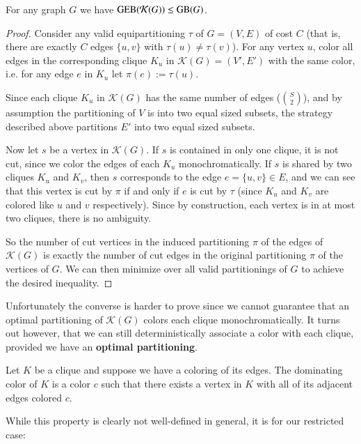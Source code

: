 	\begin{proposition}
		\label{geb-leq-gb}
		For any graph $G$ we have $\textsc{GEB}(\mathcal{K}(G)) \leq \textsc{GB}(G)$.
	\end{proposition}
	\begin{proof}
		Consider any valid equipartitioning $\tau$ of $G = (V, E)$ of cost
		$C$ (that is, there are
		exactly $C$ edges $\{u, v\}$ with $\tau(u) \neq \tau(v)$).
		For any vertex $u$,
		color all edges in the corresponding clique $K_u$ in $\mathcal{K}(G)
			= (V', E')$ with the same color, i.e. for any edge $e$ in $K_u$
		let $\pi(e) := \tau(u)$.

		Since each clique $K_u$ in $\mathcal{K}(G)$ has the same number of
		edges ($\binom{S}{2}$), and by
		assumption the partitioning of $V$ is into two equal sized subsets, the
		strategy described above partitions $E'$ into two equal sized subsets.

		Now let $s$ be a vertex in $\mathcal{K}(G)$. If $s$ is contained in
		only one clique, it is not cut,
		since we color the edges of
		each $K_u$ monochromatically. If $s$ is shared by two
		cliques $K_u$ and $K_v$, then $s$ corresponds to the edge
		$e = \{u, v\} \in E$, and
		we can see that this vertex is cut by $\pi$
		if and only if $e$ is cut by $\tau$ (since $K_u$ and
		$K_v$ are colored like $u$ and $v$ respectively).
		Since by construction,
		each vertex is in at most two cliques, there is no ambiguity.

		So the number of cut vertices in the induced partitioning $\pi$ of the
		edges of
		$\mathcal{K}(G)$ is exactly the number of cut edges in the original
		partitioning $\pi$ of the vertices of $G$. We can then minimize
		over all valid partitionings of $G$ to achieve the desired inequality.
	\end{proof}

	Unfortunately the converse is harder to prove since we cannot guarantee
	that an optimal partitioning of $\mathcal{K}(G)$ colors each clique
	monochromatically. It turns
	out however, that we can still deterministically associate a color with
	each clique, provided we have an \textbf{optimal partitioning}.

	\begin{definition}
		Let $K$ be a clique and suppose we have a coloring of its edges. The
		dominating color of $K$ is a color $c$ such that there exists a vertex
		in $K$ with all of its adjacent edges colored $c$.
	\end{definition}

	While this property is clearly not well-defined in general, it is for our
	restricted case:

